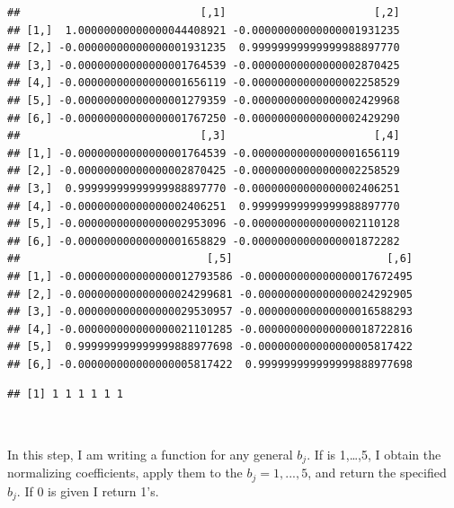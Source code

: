 \documentclass[]{article}
\newenvironment{Shaded}{\begin{snugshade}}{\end{snugshade}}
\newcommand{\KeywordTok}[1]{\textcolor[rgb]{0.13,0.29,0.53}{\textbf{#1}}}
\newcommand{\DataTypeTok}[1]{\textcolor[rgb]{0.13,0.29,0.53}{#1}}
\newcommand{\DecValTok}[1]{\textcolor[rgb]{0.00,0.00,0.81}{#1}}
\newcommand{\FloatTok}[1]{\textcolor[rgb]{0.00,0.00,0.81}{#1}}
\newcommand{\StringTok}[1]{\textcolor[rgb]{0.31,0.60,0.02}{#1}}
\newcommand{\CommentTok}[1]{\textcolor[rgb]{0.56,0.35,0.01}{\textit{#1}}}
\newcommand{\ControlFlowTok}[1]{\textcolor[rgb]{0.13,0.29,0.53}{\textbf{#1}}}
\newcommand{\OperatorTok}[1]{\textcolor[rgb]{0.81,0.36,0.00}{\textbf{#1}}}
\newcommand{\NormalTok}[1]{#1}
\begin{document}
\begin{verbatim}
##                            [,1]                       [,2]
## [1,]  1.00000000000000044408921 -0.00000000000000001931235
## [2,] -0.00000000000000001931235  0.99999999999999988897770
## [3,] -0.00000000000000001764539 -0.00000000000000002870425
## [4,] -0.00000000000000001656119 -0.00000000000000002258529
## [5,] -0.00000000000000001279359 -0.00000000000000002429968
## [6,] -0.00000000000000001767250 -0.00000000000000002429290
##                            [,3]                       [,4]
## [1,] -0.00000000000000001764539 -0.00000000000000001656119
## [2,] -0.00000000000000002870425 -0.00000000000000002258529
## [3,]  0.99999999999999988897770 -0.00000000000000002406251
## [4,] -0.00000000000000002406251  0.99999999999999988897770
## [5,] -0.00000000000000002953096 -0.00000000000000002110128
## [6,] -0.00000000000000001658829 -0.00000000000000001872282
##                             [,5]                        [,6]
## [1,] -0.000000000000000012793586 -0.000000000000000017672495
## [2,] -0.000000000000000024299681 -0.000000000000000024292905
## [3,] -0.000000000000000029530957 -0.000000000000000016588293
## [4,] -0.000000000000000021101285 -0.000000000000000018722816
## [5,]  0.999999999999999888977698 -0.000000000000000005817422
## [6,] -0.000000000000000005817422  0.999999999999999888977698
\end{verbatim}

\begin{verbatim}
## [1] 1 1 1 1 1 1
\end{verbatim}

~

In this step, I am writing a function for any general \(b_j\). If
 is 1,\ldots{},5, I obtain the normalizing coefficients, apply
them to the \(b_j = 1,...,5\), and return the specified \(b_j\). If 0 is
given I return 1's.

~

\begin{Shaded}
\end{Shaded}
\end{document}
